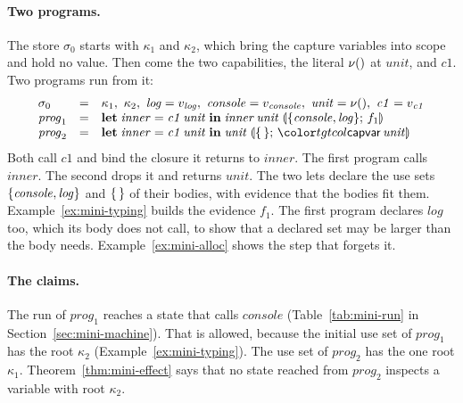 \paragraph{Two programs.}
The store $\sigma_0$ starts with $\kappa_1$ and $\kappa_2$, which bring the capture variables into scope and hold no value. Then come the two capabilities, the literal $\nu()$ at $\mathit{unit}$, and $\mathit{c1}$. Two programs run from it:
\[
\begin{array}{@{}lcl@{}}
\sigma_0 & = & \kappa_1,\ \kappa_2,\ \mathit{log} = v_{\mathit{log}},\ \mathit{console} = v_{\mathit{console}},\ \mathit{unit} = \unitv,\ \mathit{c1} = v_{\mathit{c1}} \\
\mathit{prog}_1 & = & \letc{\mathit{inner}}{\mathit{c1}\,\mathit{unit}}{\mathit{inner}\,\mathit{unit}}{\cset{\mathit{console}, \mathit{log}}}{f_1} \\
\mathit{prog}_2 & = & \letc{\mathit{inner}}{\mathit{c1}\,\mathit{unit}}{\mathit{unit}}{\cempty}{\ev{capvar}\,\mathit{unit}}
\end{array}
\]
Both call $\mathit{c1}$ and bind the closure it returns to $\mathit{inner}$. The first program calls $\mathit{inner}$. The second drops it and returns $\mathit{unit}$. The two lets declare the use sets $\{\mathit{console}, \mathit{log}\}$ and $\{\,\}$ of their bodies, with evidence that the bodies fit them. Example~\ref{ex:mini-typing} builds the evidence $f_1$. The first program declares $\mathit{log}$ too, which its body does not call, to show that a declared set may be larger than the body needs. Example~\ref{ex:mini-alloc} shows the step that forgets it.

\paragraph{The claims.}
The run of $\mathit{prog}_1$ reaches a state that calls $\mathit{console}$ (Table~\ref{tab:mini-run} in Section~\ref{sec:mini-machine}). That is allowed, because the initial use set of $\mathit{prog}_1$ has the root $\kappa_2$ (Example~\ref{ex:mini-typing}). The use set of $\mathit{prog}_2$ has the one root $\kappa_1$. Theorem~\ref{thm:mini-effect} says that no state reached from $\mathit{prog}_2$ inspects a variable with root $\kappa_2$.

